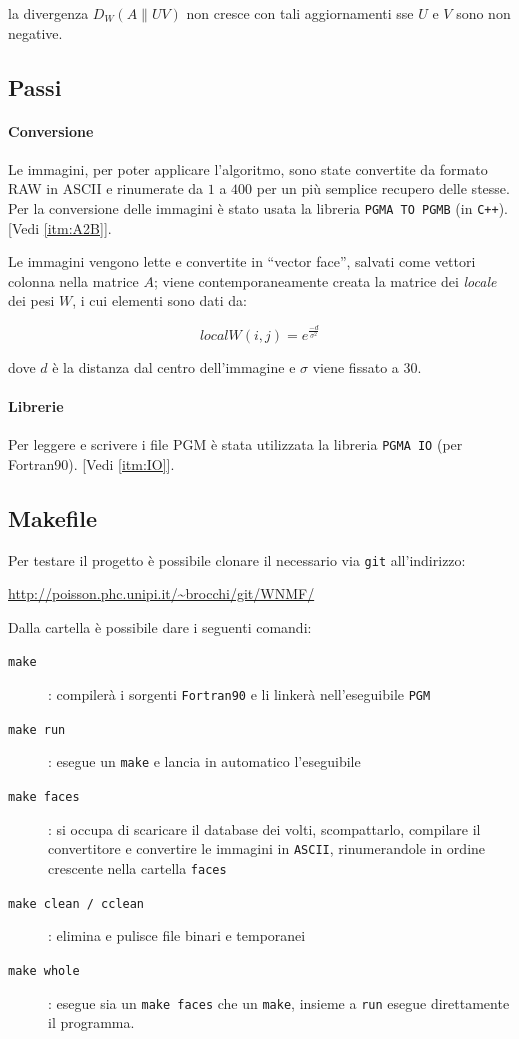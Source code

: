 \documentclass[a4paper]{article} %
\begin{document}
la divergenza $D_W(A\lVert UV)$ non cresce con tali aggiornamenti sse $U$ e $V$ sono non negative.

\subsection{Passi}
\paragraph{Conversione}\label{subsec:conversione}
Le immagini, per poter applicare l'algoritmo, sono state convertite da formato RAW in ASCII e rinumerate da $1$ a $400$ per un più semplice recupero delle stesse. Per la conversione delle immagini è stato usata la libreria \texttt{PGMA TO PGMB} (in \texttt{C++}).
[Vedi \ref{itm:A2B}].

Le immagini vengono lette e convertite in ``vector face'', salvati come vettori colonna nella matrice $A$; viene contemporaneamente creata la matrice dei \emph{locale} dei pesi $W$, i cui elementi sono dati da:

\[ localW(i,j) = e^{\frac{-d}{\sigma^2}} \]

dove $d$ è la distanza dal centro dell'immagine e $\sigma$ viene fissato a $30$.

\paragraph{Librerie} 
Per leggere e scrivere i file PGM è stata utilizzata la libreria \texttt{PGMA IO} (per Fortran90).
[Vedi \ref{itm:IO}].

\subsection{Makefile}
Per testare il progetto è possibile clonare il necessario via \texttt{git} all'indirizzo:
\begin{center} \url{http://poisson.phc.unipi.it/~brocchi/git/WNMF/} \end{center}

Dalla cartella è possibile dare i seguenti comandi:
\begin{description}
\item[\texttt{make}]: compilerà i sorgenti \texttt{Fortran90} e li linkerà nell'eseguibile \texttt{PGM}
\item[\texttt{make run}]: esegue un \texttt{make} e lancia in automatico l'eseguibile
\item[\texttt{make faces}]: si occupa di scaricare il database dei volti, scompattarlo, compilare il convertitore e convertire le immagini in \texttt{ASCII}, rinumerandole in ordine crescente nella cartella \texttt{faces}
\item[\texttt{make clean / cclean}]: elimina e pulisce file binari e temporanei
\item[\texttt{make whole}]: esegue sia un \texttt{make faces} che un \texttt{make}, insieme a \texttt{run} esegue direttamente il programma.
\end{description}
\end{document}
